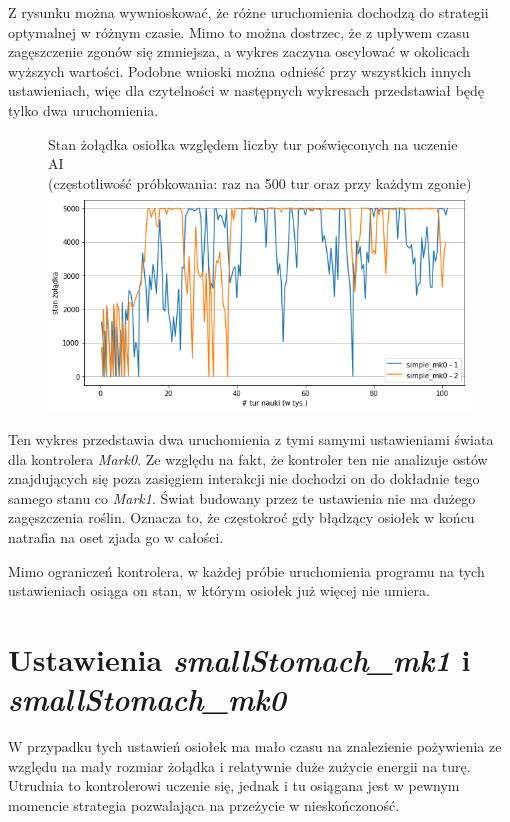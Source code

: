 Z rysunku można wywnioskować, że różne uruchomienia dochodzą do strategii optymalnej w różnym czasie. Mimo to można dostrzec, że z upływem czasu zagęszczenie zgonów się zmniejsza, a wykres zaczyna oscylować w okolicach wyższych wartości. Podobne wnioski można odnieść przy wszystkich innych ustawieniach, więc dla czytelności w następnych wykresach przedstawiał będę tylko dwa uruchomienia.

\begin{figure}[H]
    \centering    
    \footnotesize{Stan żołądka osiołka względem liczby tur poświęconych na uczenie AI
    \\(częstotliwość próbkowania: raz na 500 tur oraz przy każdym zgonie)}
    \includegraphics[scale=0.6]{Chapters/simple_mk0_hunger}
\end{figure}

Ten wykres przedstawia dwa uruchomienia z tymi samymi ustawieniami świata dla kontrolera \textit{Mark0}. Ze względu na fakt, że kontroler ten nie analizuje ostów znajdujących się poza zasięgiem interakcji nie dochodzi on do dokładnie tego samego stanu co \textit{Mark1}. Świat budowany przez te ustawienia nie ma dużego zagęszczenia roślin. Oznacza to, że częstokroć gdy błądzący osiołek w końcu natrafia na oset zjada go w całości.

Mimo ograniczeń kontrolera, w każdej próbie uruchomienia programu na tych ustawieniach osiąga on stan, w którym osiołek już więcej nie umiera.

\section{Ustawienia \textit{smallStomach\_mk1} i \textit{smallStomach\_mk0}}
W przypadku tych  ustawień osiołek ma mało czasu na znalezienie pożywienia ze względu na mały rozmiar żołądka i relatywnie duże zużycie energii na turę. Utrudnia to kontrolerowi uczenie się, jednak i tu osiągana jest w pewnym momencie strategia pozwalająca na przeżycie w nieskończoność.

